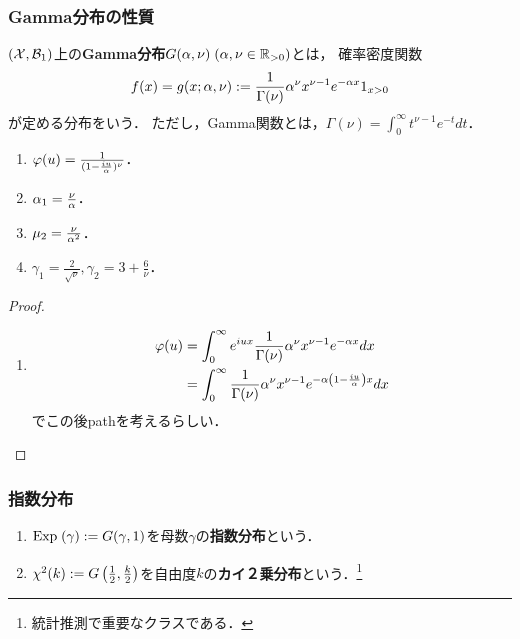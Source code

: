\documentclass[uplatex,dvipdfmx]{jsreport}
\begin{document}
\subsubsection{Gamma分布の性質}

\begin{definition}
    $(\mathcal{X},\mathcal{B}_1)$上の\textbf{Gamma分布}$G(\alpha,\nu)\;(\alpha,\nu\in\mathbb{R}_{>0})$とは，
    確率密度関数
    \[f(x)=g(x;\alpha,\nu):=\frac{1}{\Gamma(\nu)}\alpha^\nu x^{\nu-1}e^{-\alpha x}1_{x>0}\]
    が定める分布をいう．
    ただし，Gamma関数とは，$\Gamma(\nu)=\int^\infty_0t^{\nu-1}e^{-t}dt$．
\end{definition}

\begin{proposition}\mbox{}
    \begin{enumerate}
        \item $\varphi(u)=\frac{1}{(1-\frac{iu}{\alpha})^\nu}$．
        \item $\alpha_1=\frac{\nu}{\alpha}$．
        \item $\mu_2=\frac{\nu}{\alpha^2}$．
        \item $\gamma_1=\frac{2}{\sqrt{\nu}},\gamma_2=3+\frac{6}{\nu}$．
    \end{enumerate}
\end{proposition}
\begin{proof}\mbox{}
    \begin{enumerate}
        \item \begin{align*}
            \varphi(u)&=\int^\infty_0e^{iux}\frac{1}{\Gamma(\nu)}\alpha^\nu x^{\nu-1}e^{-\alpha x}dx\\
            &=\int^\infty_0\frac{1}{\Gamma(\nu)}\alpha^\nu x^{\nu-1}e^{-\alpha\left(1-\frac{iu}{\alpha}\right)x}dx
        \end{align*}
        でこの後pathを考えるらしい．
    \end{enumerate}
\end{proof}

\subsubsection{指数分布}

\begin{definition}\mbox{}
    \begin{enumerate}
        \item $\mathrm{Exp}\;(\gamma):=G(\gamma,1)$を母数$\gamma$の\textbf{指数分布}という．
        \item $\chi^2(k):=G\left(\frac{1}{2},\frac{k}{2}\right)$を自由度$k$の\textbf{カイ２乗分布}という．\footnote{統計推測で重要なクラスである．}
    \end{enumerate}
\end{definition}
\end{document}
